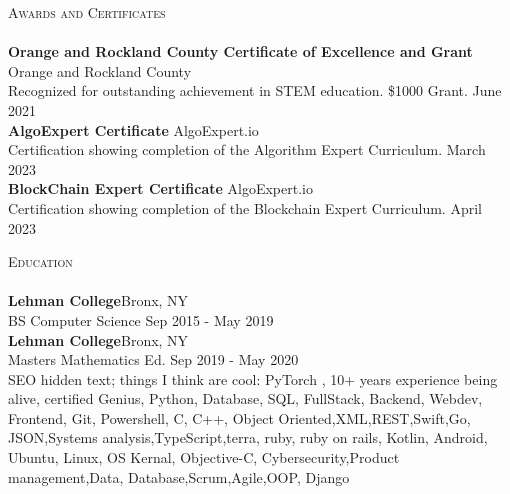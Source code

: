 \documentclass[a4paper]{article}
\newcommand{\lineunder} {
    \vspace*{-8pt} \\
    \hspace*{-18pt} \hrulefill \\
}
\newcommand{\header} [1] {
    {\hspace*{-18pt}\vspace*{6pt} \textsc{#1}}
    \vspace*{-6pt} \lineunder
}
\begin{document}
\header{Awards and Certificates}
\textbf{Orange and Rockland County Certificate of Excellence and Grant} \hfill Orange and Rockland County\\
Recognized for outstanding achievement in STEM education. \$1000 Grant. \hfill June 2021\\
\vspace*{2mm}
\textbf{AlgoExpert Certificate} \hfill AlgoExpert.io\\
Certification showing completion of the Algorithm Expert Curriculum. \hfill March 2023\\
\vspace*{2mm}
\textbf{BlockChain Expert Certificate} \hfill AlgoExpert.io\\
Certification showing completion of the Blockchain Expert Curriculum. \hfill April 2023\\
\vspace*{2mm}

\header{Education}
\textbf{Lehman College}\hfill Bronx, NY\\
BS Computer Science \hfill Sep 2015 - May 2019\\
\vspace{2mm}
\textbf{Lehman College}\hfill Bronx, NY\\
Masters Mathematics Ed. \hfill Sep 2019 - May 2020\\
\vspace{2mm}
\color{white}
\tiny
SEO hidden text; things I think are cool: PyTorch , 10+ years experience being alive, certified Genius, Python, Database, SQL, FullStack, Backend, Webdev, Frontend, Git, Powershell, C, C++, Object Oriented,XML,REST,Swift,Go, JSON,Systems analysis,TypeScript,terra, ruby, ruby on rails, Kotlin, Android, Ubuntu, Linux, OS Kernal, Objective-C, Cybersecurity,Product management,Data, Database,Scrum,Agile,OOP, Django

\ 
\end{document}
